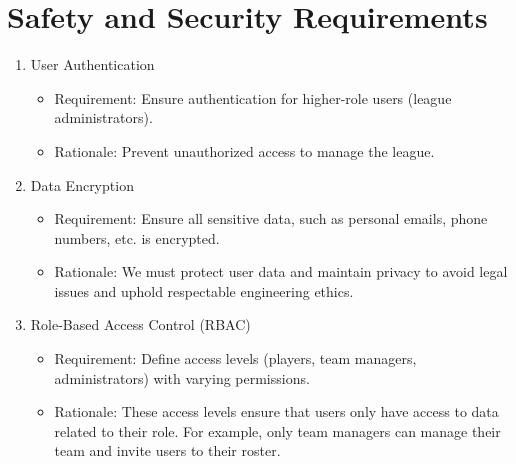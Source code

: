 \documentclass{article}
\begin{document}
\section{Safety and Security Requirements}

\begin{enumerate}
    \item User Authentication
        \begin{itemize}
            \item Requirement: Ensure authentication for higher-role users (league administrators).
            \item Rationale: Prevent unauthorized access to manage the league.
        \end{itemize}
    \item Data Encryption
        \begin{itemize}
            \item Requirement: Ensure all sensitive data, such as personal emails, phone numbers, etc. is encrypted.
            \item Rationale: We must protect user data and maintain privacy to avoid legal issues and uphold respectable engineering ethics.
        \end{itemize}
    \item Role-Based Access Control (RBAC)
        \begin{itemize}
            \item Requirement: Define access levels (players, team managers, administrators) with varying permissions.
            \item Rationale: These access levels ensure that users only have access to data related to their role. For example, only team managers can manage their team and invite users to their roster.
        \end{itemize}
\end{enumerate}
\end{document}
